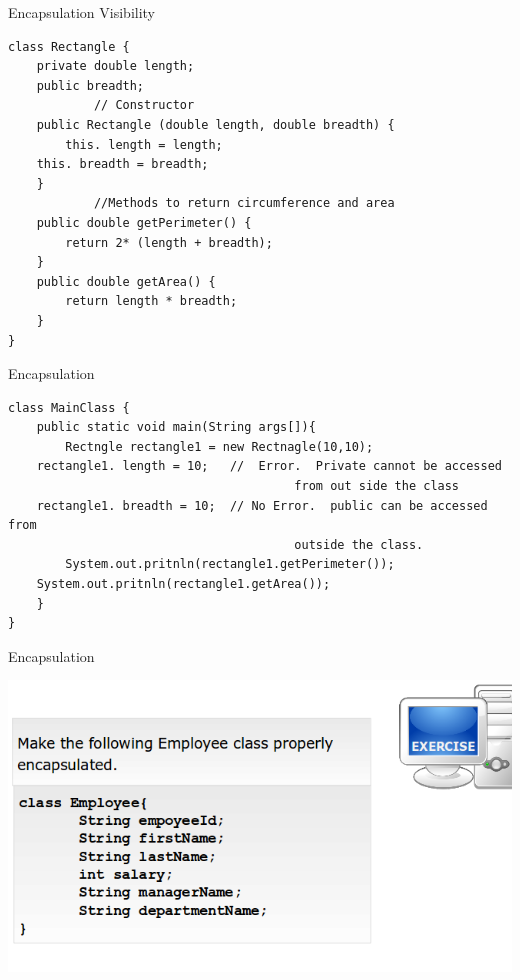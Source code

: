 \documentclass[14pt]{beamer}
\begin{document}
      
\begin{frame}[fragile]{Encapsulation}
Visibility
\begin{lstlisting}[numbers=none]
class Rectangle {
    private double length;
    public breadth;
            // Constructor
    public Rectangle (double length, double breadth) {
        this. length = length;
	this. breadth = breadth;
    }
            //Methods to return circumference and area
    public double getPerimeter() {
        return 2* (length + breadth);
    }
    public double getArea() { 
        return length * breadth; 
    }	  
}
\end{lstlisting}
\end{frame}
\begin{frame}[fragile]{Encapsulation}
\begin{lstlisting}[numbers=none]
class MainClass {
    public static void main(String args[]){
        Rectngle rectangle1 = new Rectnagle(10,10);
	rectangle1. length = 10;   //  Error.  Private cannot be accessed  
                                        from out side the class
	rectangle1. breadth = 10;  // No Error.  public can be accessed from  
                                        outside the class.
        System.out.pritnln(rectangle1.getPerimeter());
	System.out.pritnln(rectangle1.getArea());
    }
}
\end{lstlisting}
\end{frame}
\begin{frame}{Encapsulation}
\begin{center}
\includegraphics[scale=0.5]{COJ-M01-S05-Image3.png}
\end{center}
\end{frame}
\end{document}
